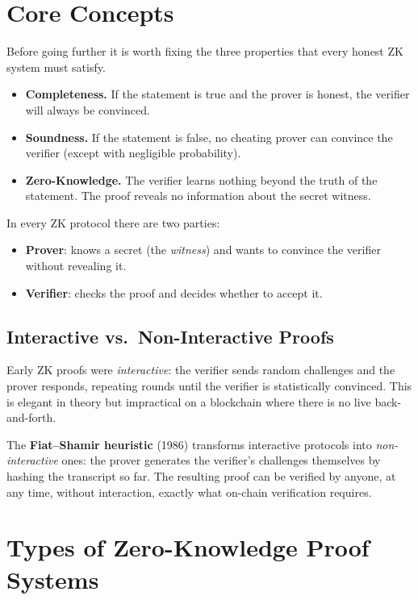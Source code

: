 \section{Core Concepts}

Before going further it is worth fixing the three properties that every honest ZK system must satisfy.

\begin{itemize}
  \item \textbf{Completeness.} If the statement is true and the prover is honest, the verifier will always be convinced.
  \item \textbf{Soundness.} If the statement is false, no cheating prover can convince the verifier (except with negligible probability).
  \item \textbf{Zero-Knowledge.} The verifier learns nothing beyond the truth of the statement. The proof reveals no information about the secret witness.
\end{itemize}

In every ZK protocol there are two parties:

\begin{itemize}
  \item \textbf{Prover}: knows a secret (the \emph{witness}) and wants to convince the verifier without revealing it.
  \item \textbf{Verifier}: checks the proof and decides whether to accept it.
\end{itemize}

\subsection*{Interactive vs.\ Non-Interactive Proofs}

Early ZK proofs were \emph{interactive}: the verifier sends random challenges and the prover responds, repeating rounds until the verifier is statistically convinced. This is elegant in theory but impractical on a blockchain where there is no live back-and-forth.

The \textbf{Fiat--Shamir heuristic} (1986) transforms interactive protocols into \emph{non-interactive} ones: the prover generates the verifier's challenges themselves by hashing the transcript so far. The resulting proof can be verified by anyone, at any time, without interaction, exactly what on-chain verification requires.

\section{Types of Zero-Knowledge Proof Systems}

